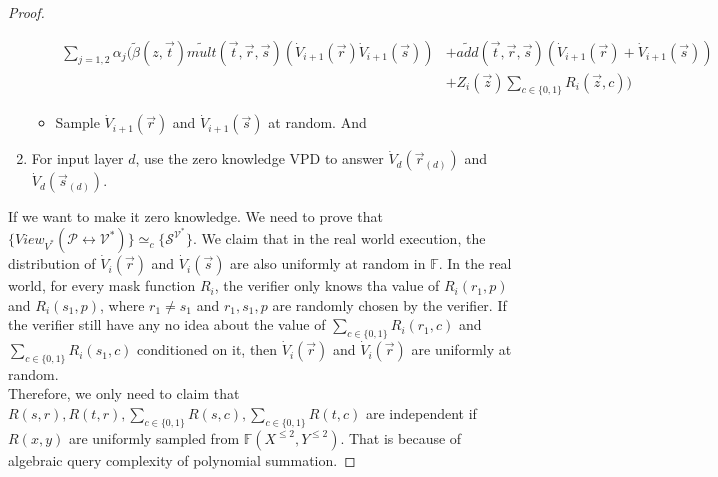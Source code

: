 \begin{proof}
\begin{enumerate}
\begin{itemize}
	\begin{align}
		\sum_{j = 1, 2} \alpha_j (\tilde{\beta}(z, \vec{t})\tilde{mult}(\vec{t}, \vec{r}, \vec{s})(\dot{V}_{i+1}(\vec{r})\dot{V}_{i+1}(\vec{s}))&+\tilde{add}(\vec{t},\vec{r},\vec{s})(\dot{V}_{i+1}(\vec{r})+\dot{V}_{i+1}(\vec{s}))\\
 		&+ Z_i(\vec{z})\sum\limits_{c \in \{0, 1\}}R_i(\vec{z}, c))
	\end{align}
	\item Sample $\dot{V}_{i+1}(\vec{r})$ and $\dot{V}_{i+1}(\vec{s})$ at random. And  
	\end{itemize}
\item For input layer $d$, use the zero knowledge VPD to answer $\dot{V}_d(\vec{r}_{(d)})$ and $\dot{V}_d(\vec{s}_{(d)})$.
\end{enumerate} 

If we want to make it zero knowledge. We need to prove that $\{View_{V^*}(\mathcal{P} \leftrightarrow \mathcal{V^*})\} \simeq_{c} \{\mathcal{S}^{\mathcal{V^*}}\}$. We claim that in the real world execution, the distribution of $\dot{V}_i(\vec{r})$ and $\dot{V}_i(\vec{s})$ are also uniformly at random in $\mathbb{F}$. In the real world, for every mask function $R_i$, the verifier only knows tha value of $R_i(r_1, p)$ and $R_i(s_1, p)$, where $r_1 \neq s_1$ and $r_1, s_1, p$ are randomly chosen by the verifier. If the verifier still have any no idea about the value of $\sum\limits_{c \in \{0, 1\}}R_i(r_1, c)$ and $\sum\limits_{c \in \{0, 1\}}R_i(s_1, c)$ conditioned on it, then $\dot{V}_i(\vec{r})$ and $\dot{V}_i(\vec{r})$ are uniformly at random.\\

Therefore, we only need to claim that $R(s, r), R(t, r), \sum\limits_{c \in \{0, 1\}}R(s, c), \sum\limits_{c \in \{0, 1\}}R(t, c)$ are independent if $R(x, y)$ are uniformly sampled from $\mathbb{F}(X^{\leqslant 2}, Y^{\leqslant 2})$. That is because of algebraic query complexity of polynomial summation.  


\end{proof}

























